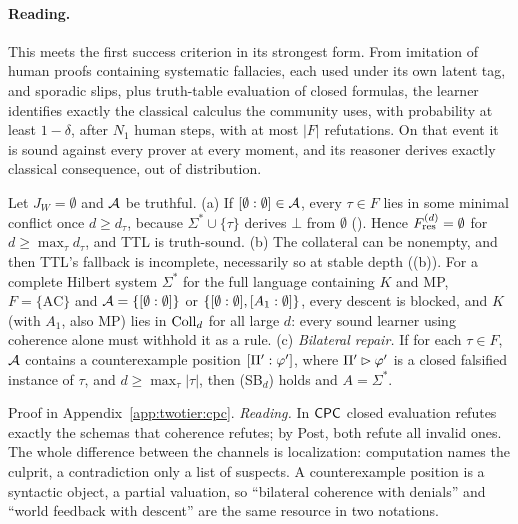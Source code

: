 \paragraph{Reading.} This meets the first success criterion in its strongest form. From imitation of human proofs containing systematic fallacies, each used under its own latent tag, and sporadic slips, plus truth-table evaluation of closed formulas, the learner identifies exactly the classical calculus the community uses, with probability at least $1-\delta$, after $N_1$ human steps, with at most $|F|$ refutations. On that event it is sound against every prover at every moment, and its reasoner derives exactly classical consequence, out of distribution.

\begin{proposition}\label{prop:twotier:coherenceonly}
Let $J_W=\emptyset$ and $\mathcal{A}$ be truthful.
\textup{(a)} If $[\emptyset : \emptyset]\in\mathcal{A}$, every $\tau\in F$ lies in some minimal conflict once $d\ge d_\tau$, because $\Sigma^*\cup\{\tau\}$ derives $\bot$ from $\emptyset$ (). Hence $F^{(d)}_{\mathrm{res}}=\emptyset$ for $d\ge\max_\tau d_\tau$, and TTL is truth-sound.
\textup{(b)} The collateral can be nonempty, and then TTL's fallback is incomplete, necessarily so at stable depth ((b)). For a complete Hilbert system $\Sigma^*$ for the full language containing $K$ and MP, $F=\{\mathrm{AC}\}$ and $\mathcal{A}=\{[\emptyset : \emptyset]\}$ or $\{[\emptyset : \emptyset],[A_1 : \emptyset]\}$, every descent is blocked, and $K$ (with $A_1$, also MP) lies in $\mathrm{Coll}_d$ for all large $d$: every sound learner using coherence alone must withhold it as a rule.
\textup{(c)} \emph{Bilateral repair.} If for each $\tau\in F$, $\mathcal{A}$ contains a counterexample position $[\Pi' : \varphi']$, where $\Pi'\rhd\varphi'$ is a closed falsified instance of $\tau$, and $d\ge\max_\tau|\tau|$, then (SB$_d$) holds and $A=\Sigma^*$.
\end{proposition}

Proof in Appendix~\ref{app:twotier:cpc}. \emph{Reading.} In $\mathsf{CPC}$ closed evaluation refutes exactly the schemas that coherence refutes; by Post, both refute all invalid ones. The whole difference between the channels is localization: computation names the culprit, a contradiction only a list of suspects. A counterexample position is a syntactic object, a partial valuation, so ``bilateral coherence with denials'' and ``world feedback with descent'' are the same resource in two notations.

